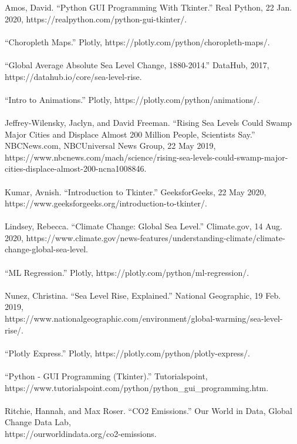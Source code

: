 \documentclass[fontsize=11pt]{article}
\begin{document}
Amos, David. “Python GUI Programming With Tkinter.” Real Python, 22 Jan. 2020, https://realpython.com/python-gui-tkinter/.\\\\
“Choropleth Maps.” Plotly, https://plotly.com/python/choropleth-maps/.\\\\
“Global Average Absolute Sea Level Change, 1880-2014.” DataHub, 2017, https://datahub.io/core/sea-level-rise.\\\\
“Intro to Animations.” Plotly, https://plotly.com/python/animations/.\\\\
Jeffrey-Wilensky,  Jaclyn,  and  David  Freeman. “Rising  Sea  Levels  Could  Swamp  Major  Cities  and  Displace  Almost 200 Million People, Scientists Say.” NBCNews.com, NBCUniversal News Group, 22 May 2019, \\ https://www.nbcnews.com/mach/science/rising-sea-levels-could-swamp-major-cities-displace-almost-200-ncna1008846. \\\\
Kumar, Avnish. “Introduction to Tkinter.” GeeksforGeeks, 22 May 2020, https://www.geeksforgeeks.org/introduction-to-tkinter/.\\\\
Lindsey,  Rebecca.    “Climate  Change:   Global  Sea  Level.” Climate.gov, 14 Aug. 2020, https://www.climate.gov/news-features/understanding-climate/climate-change-global-sea-level.\\\\
“ML Regression.” Plotly, https://plotly.com/python/ml-regression/.\\\\
Nunez, Christina.  “Sea Level Rise, Explained.” National Geographic, 19 Feb. 2019, \\ https://www.nationalgeographic.com/environment/global-warming/sea-level-rise/.\\\\
“Plotly Express.” Plotly, https://plotly.com/python/plotly-express/.\\\\
“Python - GUI Programming (Tkinter).” Tutorialspoint, \\
https://www.tutorialspoint.com/python/python\_gui\_programming.htm. \\\\
Ritchie, Hannah, and Max Roser. “CO2 Emissions.” Our World in Data, Global Change Data Lab, \\ https://ourworldindata.org/co2-emissions.\\\\
\end{document}
